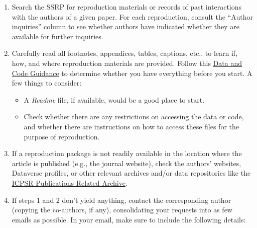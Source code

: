 \documentclass[
  openany]{book}
\providecommand{\tightlist}{%
  \setlength{\itemsep}{0pt}\setlength{\parskip}{0pt}}
\begin{document}
\begin{enumerate}
\def\labelenumi{\arabic{enumi}.}
\item
  Search the SSRP for reproduction materials or records of past interactions with the authors of a given paper. For each reproduction, consult the ``Author inquiries'' column to see whether authors have indicated whether they are available for further inquiries.
\item
  Carefully read all footnotes, appendices, tables, captions, etc., to learn if, how, and where reproduction materials are provided. Follow this \href{https://social-science-data-editors.github.io/guidance/Verification_guidance.html}{Data and Code Guidance} to determine whether you have everything before you start. A few things to consider:

  \begin{itemize}
  \tightlist
  \item
    A \emph{Readme} file, if available, would be a good place to start.\\
  \item
    Check whether there are any restrictions on accessing the data or code, and whether there are instructions on how to access these files for the purpose of reproduction.
  \end{itemize}
\item
  If a reproduction package is not readily available in the location where the article is published (e.g., the journal website), check the authors' websites, Dataverse profiles, or other relevant archives and/or data repositories like the \href{https://www.icpsr.umich.edu/icpsrweb/}{ICPSR Publications Related Archive}.
\item
  If steps 1 and 2 don't yield anything, contact the corresponding author (copying the co-authors, if any), consolidating your requests into as few emails as possible. In your email, make sure to include the following details:


\end{enumerate}
\end{document}
